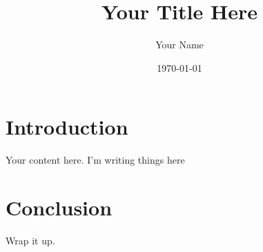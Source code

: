 \documentclass[11pt]{article}
\title{Your Title Here}
\author{Your Name}
\date{\today}
\begin{document}
\maketitle

\section{Introduction}
Your content here.
I'm writing things here

\section{Conclusion}
Wrap it up.
\end{document}
